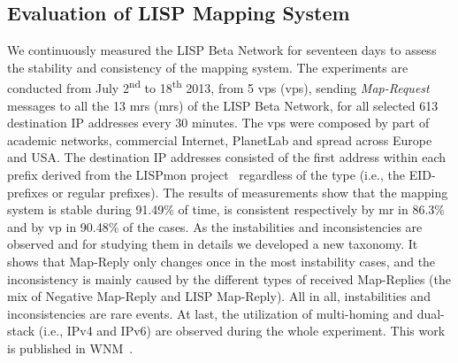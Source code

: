 \subsection{Evaluation of LISP Mapping System}
We continuously measured the LISP Beta Network for seventeen days to assess the stability and consistency of the mapping system. The experiments are conducted from July 2\textsuperscript{nd} to 18\textsuperscript{th} 2013, from 5 \acrlong{vp}s (\acrshort{vp}s), sending \emph{Map-Request} messages to all the 13 \acrlong{mr}s (\acrshort{mr}s) of the LISP Beta Network, for all selected 613 destination IP addresses every 30 minutes. The \acrshort{vp}s were composed by part of academic networks, commercial Internet, PlanetLab and spread across Europe and USA. The destination IP addresses consisted of the first address within each prefix derived from the LISPmon project~\cite{lispmon} regardless of the type (i.e., the EID-prefixes or regular prefixes). The results of measurements show that the mapping system is stable during 91.49\% of time, is consistent respectively by \acrshort{mr} in 86.3\% and by \acrshort{vp} in 90.48\% of the cases. As the instabilities and inconsistencies are observed and for studying them in details we developed a new taxonomy. It shows that Map-Reply only changes once in the most instability cases, and the inconsistency is mainly caused by the different types of received Map-Replies (the mix of Negative Map-Reply and LISP Map-Reply). All in all, instabilities and inconsistencies are rare events. At last, the utilization of multi-homing and dual-stack (i.e., IPv4 and IPv6) are observed during the whole experiment. This work is published in WNM~\cite{yue2016stability}.

